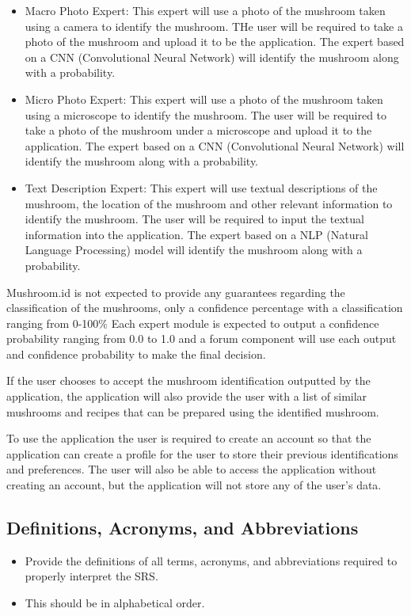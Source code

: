 \documentclass[]{article}
\begin{document}
\begin{itemize}
	\item Macro Photo Expert: This expert will use a photo of the mushroom taken using a camera to identify the mushroom. THe user will be required to take a photo of the mushroom and upload it to be the application. The expert based on a CNN (Convolutional Neural Network) will identify the mushroom along with a probability.
	\item Micro Photo Expert: This expert will use a photo of the mushroom taken using a microscope to identify the mushroom. The user will be required to take a photo of the mushroom under a microscope and upload it to the application. The expert based on a CNN (Convolutional Neural Network) will identify the mushroom along with a probability.
	\item Text Description Expert: This expert will use textual descriptions of the mushroom, the location of the mushroom and other relevant information to identify the mushroom. The user will be required to input the textual information into the application. The expert based on a NLP (Natural Language Processing) model will identify the mushroom along with a probability.
\end{itemize}

Mushroom.id is not expected to provide any guarantees regarding the classification of the mushrooms, only a confidence percentage with a classification ranging from 0-100\%
Each expert module is expected to output a confidence probability ranging from 0.0 to 1.0 and a forum component will use each output and confidence probability to make the final decision.

If the user chooses to accept the mushroom identification outputted by the application, the application will also provide the user with a list of similar mushrooms and recipes that can be prepared using the identified mushroom.

To use the application the user is required to create an account so that the application can create a profile for the user to store their previous identifications and preferences. The user will also be able to access the application without creating an account, but the application will not store any of the user's data.

\subsection{Definitions, Acronyms, and Abbreviations}
\label{sub:definitions_acronyms_and_abbreviations}
\begin{itemize}
	\item Provide the definitions of all terms, acronyms, and abbreviations required to properly interpret the SRS.
	\item This should be in alphabetical order.
\end{itemize}
\end{document}

